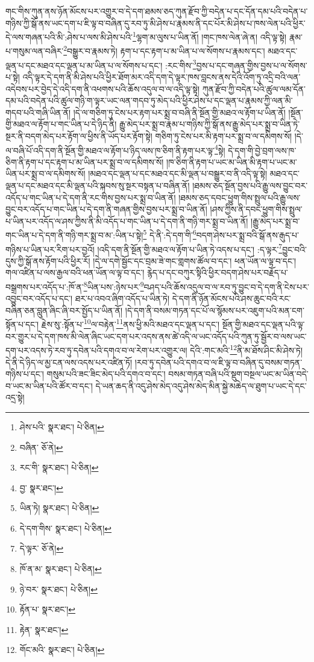 གང་གིས་ཀུན་ནས་ཉོན་མོངས་པར་འགྱུར་བ་དེ་དག་ཐམས་ཅད་ཀུན་རྫོབ་ཀྱི་བདེན་པ་དང་དོན་དམ་པའི་བདེན་པ་གཉིས་ཀྱི་སྒོ་ནས་ཡང་དག་པ་ཇི་ལྟ་བ་བཞིན་དུ་རབ་ཏུ་མི་ཤེས་པ་རྣམས་ནི་དང་པོར་མི་ཤེས་པ་ཁས་ལེན་པའི་ཕྱིར་དེ་ལས་གཞན་པའི་མི་:ཤེས་པ་ལས་མི་ཤེས་པའི་\footnote{ཤེས་པའི་  སྣར་ཐང་།  པེ་ཅིན། }ལྷག་མ་ལུས་པ་ཡིན་ནོ། །གང་ཁས་ལེན་ཞེ་ན། འདི་ལྟ་སྟེ། རྣམ་པ་གསུམ་ལན་བཞིར་\footnote{བཞིན་  ཅོ་ནེ། }བསྒྱུར་བ་རྣམས་ཏེ། རྟག་པ་དང་རྟག་པ་མ་ཡིན་པ་ལ་སོགས་པ་རྣམས་དང་། མཐའ་དང་ལྡན་པ་དང་མཐའ་དང་ལྡན་པ་མ་ཡིན་པ་ལ་སོགས་པ་དང་། :རང་གིས་\footnote{རང་གི་  སྣར་ཐང་།  པེ་ཅིན། }བྱས་པ་དང་གཞན་གྱིས་བྱས་པ་ལ་སོགས་པ་སྟེ། འདི་ལྟར་དེ་དག་ནི་མི་ཤེས་པའི་ཕྱིར་ཐོག་མར་འདི་དག་དེ་ལྟར་ཁས་བླངས་ནས་དེའི་འོག་ཏུ་འདྲི་བའི་ལན་འདེབས་པར་བྱེད་དེ་འདི་དག་ནི་འཕགས་པའི་ཆོས་འདུལ་བ་ལ་འདི་ལྟ་སྟེ། ཀུན་རྫོབ་ཀྱི་བདེན་པའི་ཚུལ་ལམ་དོན་དམ་པའི་བདེན་པའི་ཚུལ་གཉི་ག་ལྟར་ཡང་ལན་གདབ་ཏུ་མེད་པའི་ཕྱིར་ཤེས་པ་དང་ལྡན་པ་རྣམས་ཀྱི་ལན་མི་གདབ་པའི་གཞི་ཡིན་ནོ། །དེ་ལ་གཅིག་ཏུ་ངེས་པར་རྟག་པར་སྨྲ་བ་བཞི་ནི་སྔོན་གྱི་མཐའ་ལ་རྟོག་པ་ཡིན་ནོ། །སྔོན་གྱི་མཐའ་ལ་རྟོག་པ་གང་ཡིན་པ་དེ་ཉིད་ནི། རྒྱུ་མེད་པར་སྨྲ་བ་རྣམ་པ་གཉིས་ཀྱི་སྒོ་ནས་རྒྱུ་མེད་པར་སྨྲ་བ་ཡིན་ཏེ་སྔར་ནི་བདག་མེད་པར་རྟོག་ལ་ཕྱིས་ནི་ཡོད་པར་རྟོག་སྟེ། གཅིག་ཏུ་ངེས་པར་མི་རྟག་པར་སྨྲ་བ་ལ་དམིགས་སོ། །དེ་ལ་བཞི་པོ་འདི་དག་ནི་སྔོན་གྱི་མཐའ་ལ་རྟོག་པ་ཉིད་ལས་ཁ་ཅིག་ནི་རྟག་པར་ལྟ་\footnote{བྱ་  སྣར་ཐང་། }སྟེ། དེ་དག་གི་བྱེ་བྲག་ལས་ཁ་ཅིག་ནི་རྟག་པ་དང་རྟག་པ་མ་ཡིན་པར་སྨྲ་བ་ལ་དམིགས་སོ། །ཁ་ཅིག་ནི་རྟག་པ་ཡང་མ་ཡིན་མི་རྟག་པ་ཡང་མ་ཡིན་པར་སྨྲ་བ་ལ་དམིགས་སོ། །མཐའ་དང་ལྡན་པ་དང་མཐའ་དང་མི་ལྡན་པ་བསྒྱུར་བ་ནི་འདི་ལྟ་སྟེ། མཐའ་དང་ལྡན་པ་དང་མཐའ་དང་མི་ལྡན་པའི་སྐབས་སུ་སྔར་བསྟན་པ་བཞིན་ནོ། །ཐམས་ཅད་སྔོན་བྱས་པའི་རྒྱུ་ལས་བྱུང་བར་འདོད་པ་གང་ཡིན་པ་དེ་དག་ནི་རང་གིས་བྱས་པར་སྨྲ་བ་ཡིན་ནོ། །ཐམས་ཅད་དབང་ཕྱུག་གིས་སྤྲུལ་པའི་རྒྱུ་ལས་བྱུང་བར་འདོད་པ་གང་ཡིན་པ་དེ་དག་ནི་གཞན་གྱིས་བྱས་པར་སྨྲ་བ་ཡིན་ནོ། །ཤས་ཀྱིས་ནི་དབང་ཕྱུག་གིས་སྤྲུལ་པ་ཡིན་པར་འདོད་ལ་ཤས་ཀྱིས་ནི་མི་འདོད་པ་གང་ཡིན་པ་དེ་དག་ནི་གཉི་གར་སྨྲ་བ་ཡིན་ནོ། །རྒྱུ་མེད་པར་སྨྲ་བ་གང་ཡིན་པ་དེ་དག་ནི་གཉི་གར་སྨྲ་བ་མ་:ཡིན་པ་སྟེ།\footnote{ཡིན་ཏེ།  སྣར་ཐང་།  པེ་ཅིན། } དེ་ནི་:དེ་དག་གི་\footnote{དེ་དག་གིས་  སྣར་ཐང་།  པེ་ཅིན། }བདག་ཤེས་པར་སྨྲ་བའི་སྒོ་ནས་རྒུད་པ་གཉིས་པ་ཡིན་པར་རིག་པར་བྱའོ། །འདི་དག་ནི་སྔོན་གྱི་མཐའ་ལ་རྟོག་པ་ཡིན་ཏེ་འདས་པ་དང་། :ད་ལྟར་\footnote{དེ་ལྟར་  ཅོ་ནེ། }བྱུང་བའི་དུས་ཀྱི་སྒོ་ནས་རྟོག་པའི་ཕྱིར་རོ། །དེ་ལ་དགེ་སྦྱོང་དང་བྲམ་ཟེ་གང་གླགས་ཚོལ་བ་དང་། ཕན་ཡོན་ལ་ལྟ་བ་དང་། གལ་འཛིན་པ་ལས་རྒྱལ་བའི་ཕན་ཡོན་ལ་ལྟ་བ་དང་། རྙེད་པ་དང་བཀུར་སྟིའི་ཕྱིར་བདག་ཤེས་པར་བརྗོད་པ་བསྒྲགས་པར་འདོད་པ་:ཁོ་ན་\footnote{ཁོ་ན་མ་  སྣར་ཐང་།  པེ་ཅིན། }ཡིན་པས་:ཉེས་པར་\footnote{ཉེ་བར་  སྣར་ཐང་།  པེ་ཅིན། }བཤད་པའི་ཆོས་འདུལ་བ་ལ་རབ་ཏུ་བྱུང་བ་དེ་དག་ནི་ངེས་པར་འབྱུང་བར་འདོད་པ་དང་། ཐར་པ་འབའ་ཞིག་འདོད་པ་ཡིན་ཏེ། དེ་དག་ནི་ཉོན་མོངས་པའི་ཤས་ཆུང་བའི་རང་བཞིན་ཅན་བླུན་ཞིང་ཞི་བར་སྤྱོད་པ་ཡིན་ནོ། །དེ་དག་ནི་བསམ་གཏན་དང་པོ་ལ་སྙོམས་པར་འཇུག་པའི་མན་ངག་སྟོན་པ་དང་། རྗེས་སུ་:སྟོན་པ་\footnote{རྟོན་པ་  སྣར་ཐང་། }ལ་བརྟེན་\footnote{རྟེན་  སྣར་ཐང་། }ནས་ཕྱི་མའི་མཐའ་དང་ལྡན་པ་དང་། སྔོན་གྱི་མཐའ་དང་ལྡན་པའི་ལྟ་བར་གྱུར་པ་དེ་དག་ཁས་མི་ལེན་ཞིང་ཡང་དག་པར་འདས་ནས་ཚེ་འདི་ལ་ཡང་འདོད་པའི་ཀུན་ཏུ་སྦྱོར་བ་ལས་ཡང་དག་པར་འདས་ཏེ་རབ་ཏུ་དབེན་པའི་དགའ་བ་ལ་རེག་པར་འགྱུར་ལ། དེའི་:གང་མའི་\footnote{གོང་མའི་  སྣར་ཐང་།  པེ་ཅིན། }ནི་མ་ཐོས་ཤིང་མི་ཤེས་ཏེ། དེ་ནི་དེ་ཉིད་ལ་མྱ་ངན་ལས་འདས་པར་འཛིན་ཏོ། །རབ་ཏུ་དབེན་པའི་དགའ་བ་ལ་ཇི་ལྟ་བ་བཞིན་དུ་བསམ་གཏན་གཉིས་པ་དང་། གསུམ་པའི་ཟང་ཟིང་མེད་པའི་དགའ་བ་དང་། བསམ་གཏན་བཞི་པའི་སྡུག་བསྔལ་ཡང་མ་ཡིན་བདེ་བ་ཡང་མ་ཡིན་པའི་ཚོར་བ་དང་། དེ་ཡན་ཆད་ནི་འདུ་ཤེས་མེད་འདུ་ཤེས་མེད་མིན་སྐྱེ་མཆེད་ལ་ཐུག་པ་ཡང་དེ་དང་འདྲ་སྟེ། 